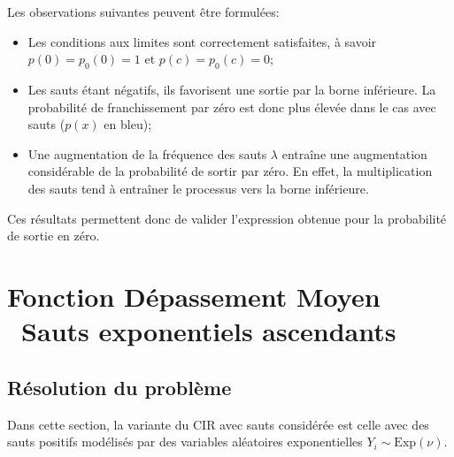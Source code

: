 Les observations suivantes peuvent être formulées:
\begin{itemize}
    \item Les conditions aux limites sont correctement satisfaites, à savoir \( p(0) = p_0(0) = 1 \) et \( p(c) = p_0(c) = 0 \);
    \item Les sauts étant négatifs, ils favorisent une sortie par la borne inférieure. La probabilité de franchissement par zéro est donc plus élevée dans le cas avec sauts ($p(x)$ en bleu);
    \item Une augmentation de la fréquence des sauts $\lambda$ entraîne une augmentation considérable de la probabilité de sortir par zéro. En effet, la multiplication des sauts tend à entraîner le processus vers la borne inférieure.
\end{itemize}
Ces résultats permettent donc de valider l'expression obtenue pour la probabilité de sortie en zéro.

\section{Fonction Dépassement Moyen \textemdash~Sauts exponentiels ascendants}
\subsection{Résolution du problème}
Dans cette section, la variante du \ac{CIR} avec sauts considérée est celle avec des sauts positifs modélisés par des variables aléatoires exponentielles $Y_i\sim \text{Exp}(\nu)$.

